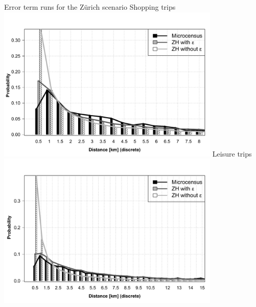 %
{Error term runs for the Zürich scenario}%
{\label{fig:zhLEGO}}%
{%
  \createsubfigure%
  {Shopping trips}%
	{\includegraphics[trim=0cm 0cm 0cm 2cm, clip,width=0.8\textwidth,angle=0]{extending/figures/dc/zhShopping.pdf}}%
  {\label{fig:zhShopping}}%
  {}%
   \createsubfigure%
  {Leisure trips}%
 {\includegraphics[trim=0cm 0cm 0cm 2cm, clip, width=0.8\textwidth,angle=0]{extending/figures/dc//zhLeisure.pdf}}%
  {\label{fig:zhLeisure}}%
  {}%
}%
{}

